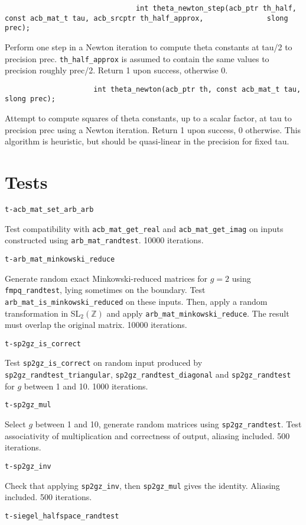 \documentclass{article}
\newcommand{\code}[1]{\lstinline:#1:}
\newcommand{\fun}[1]{\vspace{2mm}\noindent \code{#1}}
\begin{document}
\fun{                              
int theta_newton_step(acb_ptr th_half, const acb_mat_t tau, acb_srcptr th_half_approx,
		      slong prec);
}

Perform one step in a Newton iteration to compute theta constants at
tau/2 to precision prec. \code{th_half_approx} is assumed to contain
the same values to precision roughly prec/2. Return 1 upon success,
otherwise 0.

\fun{                    
int theta_newton(acb_ptr th, const acb_mat_t tau, slong prec);
}

Attempt to compute squares of theta constants, up to a scalar factor,
at tau to precision prec using a Newton iteration. Return 1 upon
success, 0 otherwise. This algorithm is heuristic, but should be
quasi-linear in the precision for fixed tau.

\section{Tests}

\fun{t-acb_mat_set_arb_arb}

Test compatibility with \code{acb_mat_get_real} and
\code{acb_mat_get_imag} on inputs constructed using
\code{arb_mat_randtest}. 10000 iterations.

\fun{t-arb_mat_minkowski_reduce}

Generate random exact Minkowski-reduced matrices for $g=2$ using
\code{fmpq_randtest}, lying sometimes on the boundary. Test
\code{arb_mat_is_minkowski_reduced} on these inputs. Then, apply a
random transformation in SL$_2(\mathbb{Z})$ and apply
\code{arb_mat_minkowski_reduce}. The result must overlap the original
matrix. 10000 iterations.

\fun{t-sp2gz_is_correct}

Test \code{sp2gz_is_correct} on random input produced by
\code{sp2gz_randtest_triangular}, \code{sp2gz_randtest_diagonal} and
\code{sp2gz_randtest} for $g$ between 1 and 10. 1000 iterations.

\fun{t-sp2gz_mul}

Select $g$ between 1 and 10, generate random matrices using
\code{sp2gz_randtest}. Test associativity of multiplication and
correctness of output, aliasing included. 500 iterations.

\fun{t-sp2gz_inv}

Check that applying \code{sp2gz_inv}, then \code{sp2gz_mul} gives the
identity. Aliasing included. 500 iterations.

\fun{t-siegel_halfspace_randtest}
\end{document}
